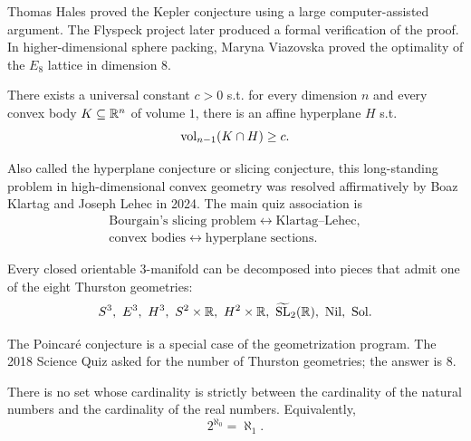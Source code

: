     \begin{remark}
        Thomas Hales proved the Kepler conjecture using a large computer-assisted
        argument. The Flyspeck project later produced a formal verification of
        the proof. In higher-dimensional sphere packing, Maryna Viazovska proved
        the optimality of the $E_8$ lattice in dimension $8$.
    \end{remark}

    \begin{theorem}
        There exists a universal constant $c>0$ s.t. for every dimension $n$
        and every convex body $K\subseteq\mathbb{R}^n$ of volume $1$, there is an
        affine hyperplane $H$ s.t.
        \[
            \operatorname{vol}_{n-1}(K\cap H)\geq c.
        \]
    \end{theorem}

    \begin{remark}
        Also called the hyperplane conjecture or slicing conjecture, this
        long-standing problem in high-dimensional convex geometry was resolved
        affirmatively by Boaz Klartag and Joseph Lehec in 2024. The main quiz
        association is
        \[
            \begin{gathered}
                \text{Bourgain's slicing problem}
                \longleftrightarrow \text{Klartag--Lehec},\\
                \text{convex bodies}
                \longleftrightarrow \text{hyperplane sections}.
            \end{gathered}
        \]
    \end{remark}

    \begin{theorem}
        Every closed orientable $3$-manifold can be decomposed into pieces that
        admit one of the eight Thurston geometries:
        \[
            S^3,\ E^3,\ H^3,\ S^2\times\R,\ H^2\times\R,
            \ \widetilde{\SL}_2(\R),\ \mathrm{Nil},\ \mathrm{Sol}.
        \]
    \end{theorem}

    \begin{remark}
        The Poincaré conjecture is a special case of the geometrization program.
        The 2018 Science Quiz asked for the number of Thurston geometries; the
        answer is $8$.
    \end{remark}

    \begin{hypothesis}
        There is no set whose cardinality is strictly between the cardinality of
        the natural numbers and the cardinality of the real numbers. Equivalently,
        \[
            2^{\aleph_0}=\aleph_1.
        \]
    \end{hypothesis}

